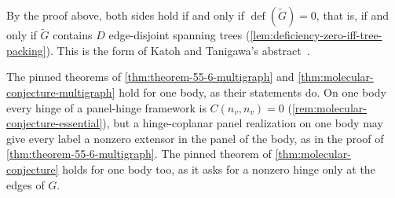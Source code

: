 By the proof above, both sides hold if and only if
$\operatorname{def}(\tilde G) = 0$, that is, if and only if $\tilde G$
contains $D$ edge-disjoint spanning trees
(\cref{lem:deficiency-zero-iff-tree-packing}). This is the form of
Katoh and Tanigawa's abstract~\cite[p.~647]{katohTanigawa2011}.

\begin{remark}
  \label{rem:coplanar-single-body}
  The pinned theorems of \cref{thm:theorem-55-6-multigraph} and
  \cref{thm:molecular-conjecture-multigraph} hold for one body, as their
  statements do. On one body every hinge of a panel-hinge framework is
  $C(n_v, n_v) = 0$ (\cref{rem:molecular-conjecture-essential}), but a
  hinge-coplanar panel realization on one body may give every label a
  nonzero extensor in the panel of the body, as in the proof of
  \cref{thm:theorem-55-6-multigraph}. The pinned theorem of
  \cref{thm:molecular-conjecture} holds for one body too, as it asks for
  a nonzero hinge only at the edges of $G$.
\end{remark}
